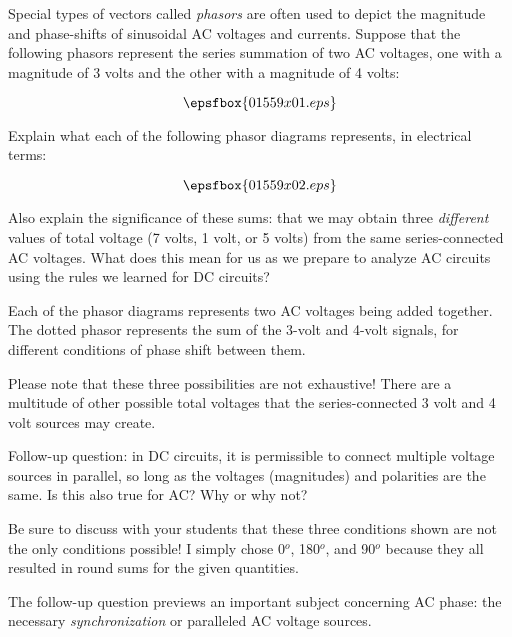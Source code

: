 

Special types of vectors called {\it phasors} are often used to depict the magnitude and phase-shifts of sinusoidal AC voltages and currents.  Suppose that the following phasors represent the series summation of two AC voltages, one with a magnitude of 3 volts and the other with a magnitude of 4 volts:

$$\epsfbox{01559x01.eps}$$

Explain what each of the following phasor diagrams represents, in electrical terms:

$$\epsfbox{01559x02.eps}$$

Also explain the significance of these sums: that we may obtain three {\it different} values of total voltage (7 volts, 1 volt, or 5 volts) from the same series-connected AC voltages.  What does this mean for us as we prepare to analyze AC circuits using the rules we learned for DC circuits?







Each of the phasor diagrams represents two AC voltages being added together.  The dotted phasor represents the sum of the 3-volt and 4-volt signals, for different conditions of phase shift between them.

Please note that these three possibilities are not exhaustive!  There are a multitude of other possible total voltages that the series-connected 3 volt and 4 volt sources may create.

\vskip 10pt

Follow-up question: in DC circuits, it is permissible to connect multiple voltage sources in parallel, so long as the voltages (magnitudes) and polarities are the same.  Is this also true for AC?  Why or why not?







Be sure to discuss with your students that these three conditions shown are not the only conditions possible!  I simply chose 0$^{o}$, 180$^{o}$, and 90$^{o}$ because they all resulted in round sums for the given quantities.

The follow-up question previews an important subject concerning AC phase: the necessary {\it synchronization} or paralleled AC voltage sources.




